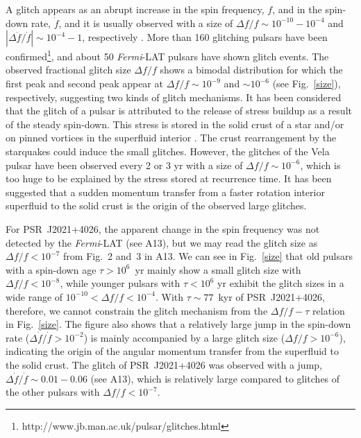 \documentclass[12pt,preprint]{aastex}
\begin{document}
A glitch appears as an abrupt increase in the spin frequency, $f$, and in the spin-down rate, $\dot{f}$, and it is usually observed with 
 a  size of  $\Delta f/f\sim 10^{-10}-10^{-4}$ and  $|\Delta \dot{f}/\dot{f}|\sim 10^{-4}-1$, respectively \citep{esp11}. 
More than 160 glitching pulsars have been confirmed\footnote{http://www.jb.man.ac.uk/pulsar/glitches.html}, and about 50 \emph{Fermi}-LAT pulsars have shown glitch events.  The observed fractional glitch size $\Delta f/f$ shows a bimodal distribution \citep{wang10, esp11, yu13} for which the first peak and
second peak appear at $\Delta f/f\sim 10^{-9}$ and $\sim 10^{-6}$ (see Fig.~\ref{size}), respectively, suggesting two kinds of glitch mechanisms.
It has been considered that the glitch of a pulsar is attributed to the release of stress buildup as a result of the steady spin-down.  This stress is stored in the solid crust of a star \citep{rud69, bay71, has15} and/or on pinned vortices in the superfluid interior \citep{alp84, has15}.
The crust rearrangement by the starquakes could induce the small glitches.
However, the glitches of the Vela pulsar have been observed every 2 or 3 yr
with a size of $\Delta f/f\sim 10^{-6}$, which is too huge to be explained by the stress stored at recurrence time.
It has been suggested that a sudden momentum transfer from a faster rotation interior superfluid to the solid crust is the origin of the observed large glitches.

For PSR~J2021+4026, the apparent change in the spin frequency was not detected by the \emph{Fermi}-LAT (see A13), but we may read the glitch size as $\Delta f/f < 10^{-7}$ from Fig.~2 and~3 in A13.  
We can see in Fig.~\ref{size} that old pulsars with a spin-down age $\tau>10^6$~yr mainly show a small glitch size with $\Delta f/f<10^{-8}$, while younger pulsars with $\tau <10^{6}$ yr exhibit the glitch sizes in a wide range of $10^{-10}<\Delta f/f<10^{-4}$. With $\tau\sim 77$~kyr of PSR~J2021+4026, therefore, we cannot constrain the glitch mechanism from the $\Delta f/f-\tau$ relation in Fig.~\ref{size}.   
The figure also shows that a relatively large jump in the spin-down rate ($\Delta \dot {f}/\dot{f}>10^{-2}$) is mainly  accompanied by a large glitch size ($\Delta f/f>10^{-6}$), indicating the origin of the angular momentum transfer from the superfluid to the solid crust. 
The glitch of PSR~J2021+4026 was observed with a jump, $\Delta \dot {f}/\dot{f}\sim 0.01-0.06$ (see A13), which is relatively large compared to glitches of the other pulsars with $\Delta f/f < 10^{-7}$. 
\end{document}
